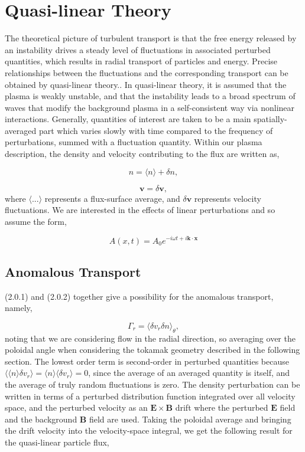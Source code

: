 \documentclass[12pt]{article}
\numberwithin{equation}{subsection}
\begin{document}
\section{Quasi-linear Theory}
   \quad The theoretical picture of turbulent transport is that the free energy released by an instability drives a steady level of
fluctuations in associated perturbed quantities, which results in radial transport of particles and energy. Precise relationships
between the fluctuations and the corresponding transport can be obtained by quasi-linear theory.\cite{WessonC}. In quasi-linear
theory, it is assumed that the plasma is weakly unstable, and that the instability leads to a broad spectrum of waves that modify
the background plasma in a self-consistent way via nonlinear interactions\cite{GurnBhatA}. Generally, quantities of interest are taken
to be a main spatially-averaged part which varies slowly with time compared to the frequency of perturbations, summed with a fluctuation
quantity. Within our plasma description, the density and velocity contributing to the flux are written as,
   
   \begin{equation}
      n = \langle n \rangle + \delta n,
   \end{equation}

   \begin{equation}
      \bm{v} = \delta \bm{v},
   \end{equation}
where $\langle ... \rangle$ represents a flux-surface average, and $\delta \bm{v}$ represents velocity fluctuations. We are interested in
the effects of linear perturbations and so assume the form,
   
   \begin{equation}
      A(x,t) = A_0e^{-i\omega t + i\bm{k}\cdot\bm{x}} 
   \end{equation}

\subsection{Anomalous Transport}
   \quad (2.0.1) and (2.0.2) together give a possibility for the anomalous transport, namely,
   
   \begin{equation}
      \Gamma_r = \langle\delta v_r \delta n\rangle_\theta,
   \end{equation}
noting that we are considering flow in the radial direction, so averaging over the poloidal angle when considering the tokamak
geometry described in the following section. The lowest order term is second-order in perturbed quantities because
$\langle \langle n \rangle \delta v_r \rangle = \langle n \rangle \langle \delta v_r \rangle = 0$, since the average of an averaged
quantity is itself, and the average of truly random fluctuations is zero. The density perturbation can be written in terms of a
perturbed distribution function integrated over all velocity space, and the perturbed velocity as an $\bm{E}\times\bm{B}$ drift
where the perturbed $\bm{E}$ field and the background $\bm{B}$ field are used. Taking the poloidal average and bringing the drift
velocity into the velocity-space integral, we get the following result for the quasi-linear particle flux,
   
\end{document}
